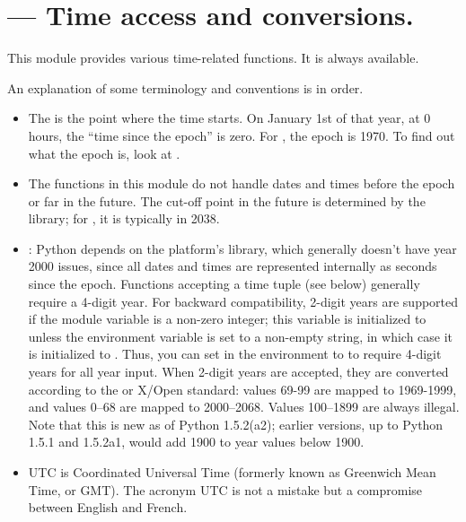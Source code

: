 \section{ ---
         Time access and conversions.}



This module provides various time-related functions.
It is always available.

An explanation of some terminology and conventions is in order.

\begin{itemize}

\item
The  is the point where the time starts.  On
January 1st of that year, at 0 hours, the ``time since the epoch'' is
zero.  For \UNIX{}, the epoch is 1970.  To find out what the epoch is,
look at .%

\item
The functions in this module do not handle dates and times before the
epoch or far in the future.  The cut-off point in the future is
determined by the \C{} library; for \UNIX{}, it is typically in 2038.%

\item
{}: Python depends on the platform's \C{}
library, which generally doesn't have year 2000 issues, since all
dates and times are represented internally as seconds since the
epoch.  Functions accepting a time tuple (see below) generally require
a 4-digit year.  For backward compatibility, 2-digit years are
supported if the module variable  is a non-zero
integer; this variable is initialized to  unless the
environment variable  is set to a non-empty string,
in which case it is initialized to .  Thus, you can set
 in the environment to  to require 4-digit
years for all year input.  When 2-digit years are accepted, they are
converted according to the \POSIX{} or X/Open standard: values 69-99
are mapped to 1969-1999, and values 0--68 are mapped to 2000--2068.
Values 100--1899 are always illegal.  Note that this is new as of
Python 1.5.2(a2); earlier versions, up to Python 1.5.1 and 1.5.2a1,
would add 1900 to year values below 1900.%
%

\item
UTC is Coordinated Universal Time (formerly known as Greenwich Mean
Time, or GMT).  The acronym UTC is not a mistake but a compromise
between English and French.%
%
%


\end{itemize}
